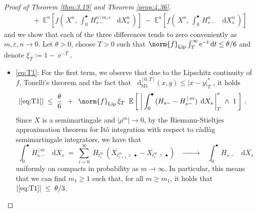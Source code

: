 \documentclass[11pt]{article}
\theoremstyle{definition}\newtheorem{example}[theorem]{Example}
\theoremstyle{definition}\newtheorem{counterexample}[theorem]{Counterexample}
\theoremstyle{definition}\newtheorem{remark}[theorem]{Remark}
\theoremstyle{definition}\newtheorem{defi}[theorem]{Definition}
\numberwithin{equation}{section}
\newcommand{\e}{\operatorname{e}}
\newcommand*\diff{\mathop{}\!\mathrm{d}}								%
\newcommand{\E}{\mathbb{E}}											%
\renewcommand{\|}{\; : \, \;}											%
\newcommand{\conv}[2]{\; \xrightarrow[ {#1}]{#2} \; }						%
\newcommand{\dM}{\diff_{\operatorname{M1}}}							%
\begin{document}
\begin{proof}[Proof of Theorem \ref{thm:3.19} and Theorem \ref{prop:4.36}]
\begin{align*}
		& \qquad + \;\E^n\left[ f \left(\, X^n, \, \int_0^\bullet \, H^{n \, \vert \, m,\varepsilon}_{s-} \; \diff X^n_s \, \right)\right] \; - \; \E^n\left[ f \left(\, X^n, \, \int_0^\bullet \, H^{n}_{s-} \; \diff X^n_s \, \right)\right] \label{eq:T4} \tag{T4}
	\end{align*}
	and we show that each of the three differences tends to zero conveniently as $m,\varepsilon, n\to 0$. Let $\theta>0$, choose $T>0$ such that $\norm{f}_{\operatorname{Lip}} \int_T^\infty \e^{-t} \diff t \le \theta/6$ and denote $\xi_T:= 1- \e^{-T}$.
	\begin{itemize}
		\item \eqref{eq:T1}: For the first term, we observe that due to the Lipschitz continuity of $f$, Tonelli's theorem and the fact that $\dM^{[0,T]}(x,y)\le |x-y|^*_T$ , it holds 
		\begin{align*}
			|\eqref{eq:T1}| \; &\le \; \frac \theta 6 \; \; + \; \; \norm{f}_{\operatorname{Lip}} \, \xi_T \; \;  \E\left[ \; \left| \, \int_0^\bullet \, (H_{s-} - H^{\, \vert \, m}_{s-}) \; \diff X_s \, \right|^*_T \; \wedge \; 1 \; \right] \, .
		\end{align*}
		Since $X$ is a semimartingale and $|\rho^m|\to 0$, by the Riemann-Stieltjes approximation theorem for Itô integration with respect to càdlàg semimartingale integrators, we have that 
		$$ \int_0^\bullet \, H^{\,\vert \, m}_{s-} \; \diff X_s \; = \; \sum_{i=0}^{\infty} \; H_{t_{i}^m} \, \left( X_{t_{i+1}^m \, \wedge\,  \bullet}-X_{t_i^m \, \wedge \, \bullet}\right) \; \; \conv{\phantom{m\to \infty}}{} \; \; \int_0^\bullet \, H_{s-} \; \diff X_s $$ 
		uniformly on compacts in probability as $m\to \infty$. In particular, this means that we can find $m_1 \ge 1$ such that, for all $m\ge m_1$, it holds that $ |\eqref{eq:T1}| \; \le \; \theta/3$.
		

\end{itemize}
\end{proof}
\end{document}

